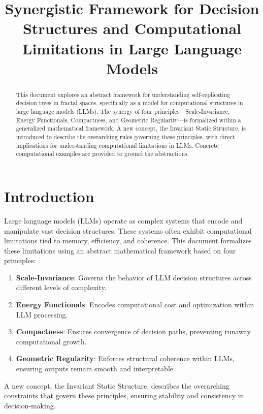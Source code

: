 \documentclass[12pt]{article}
\title{Synergistic Framework for Decision Structures and Computational Limitations in Large Language Models}
\author{}
\date{}
\begin{document}
\maketitle

\begin{abstract}
This document explores an abstract framework for understanding self-replicating decision trees in fractal spaces, specifically as a model for computational structures in large language models (LLMs). The synergy of four principles---Scale-Invariance, Energy Functionals, Compactness, and Geometric Regularity---is formalized within a generalized mathematical framework. A new concept, the Invariant Static Structure, is introduced to describe the overarching rules governing these principles, with direct implications for understanding computational limitations in LLMs. Concrete computational examples are provided to ground the abstractions.
\end{abstract}

\tableofcontents

\section{Introduction}
Large language models (LLMs) operate as complex systems that encode and manipulate vast decision structures. These systems often exhibit computational limitations tied to memory, efficiency, and coherence. This document formalizes these limitations using an abstract mathematical framework based on four principles:

\begin{enumerate}
    \item \textbf{Scale-Invariance}: Governs the behavior of LLM decision structures across different levels of complexity.
    \item \textbf{Energy Functionals}: Encodes computational cost and optimization within LLM processing.
    \item \textbf{Compactness}: Ensures convergence of decision paths, preventing runaway computational growth.
    \item \textbf{Geometric Regularity}: Enforces structural coherence within LLMs, ensuring outputs remain smooth and interpretable.
\end{enumerate}

A new concept, the Invariant Static Structure, describes the overarching constraints that govern these principles, ensuring stability and consistency in decision-making.
\end{document}
